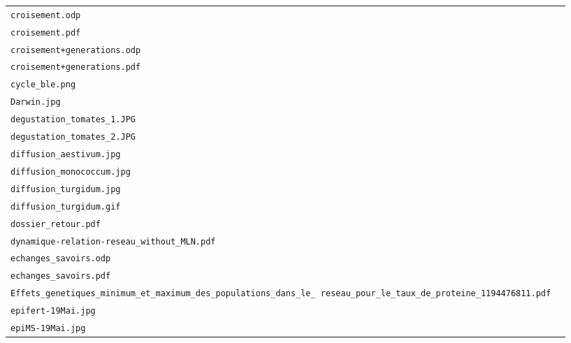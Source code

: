 \begin{center}
\begin{supertabular}{p{.8\textwidth}c}
\texttt{croisement.odp} & \cite{croisement} \\
\texttt{croisement.pdf} & \\ \hline

\texttt{croisement+generations.odp} & \cite{croisement+generations} \\
\texttt{croisement+generations.pdf} &  \\ \hline

\texttt{cycle\_ble.png} & \cite{cycle_ble} \\ \hline

\texttt{Darwin.jpg} & \cite{Darwin} \\ \hline

\texttt{degustation\_tomates\_1.JPG} & \cite{degustation_tomates_1} \\ \hline

\texttt{degustation\_tomates\_2.JPG} & \cite{degustation_tomates_2} \\ \hline

\texttt{diffusion\_aestivum.jpg} & \cite{diffusion_aestivum} \\ \hline

\texttt{diffusion\_monococcum.jpg} & \cite{diffusion_monococcum} \\ \hline

\texttt{diffusion\_turgidum.jpg} & \cite{diffusion_turgidum} \\
\texttt{diffusion\_turgidum.gif} & \\ \hline

\texttt{dossier\_retour.pdf} & \cite{dossier_retour} \\ \hline

\texttt{dynamique-relation-reseau\_without\_MLN.pdf} & \cite{dynamique-relation-reseau_without_MLN} \\ \hline

\texttt{echanges\_savoirs.odp} & \cite{echanges_savoirs} \\
\texttt{echanges\_savoirs.pdf} \\ \hline

\texttt{Effets\_genetiques\_minimum\_et\_maximum\_des\_populations\_dans\_le\_
reseau\_pour\_le\_taux\_de\_proteine\_1194476811.pdf} & \cite{Effets_genetiques_minimum_et_maximum_des_populations_dans_le_reseau_pour_le_taux_de_proteine_1194476811} \\ \hline

\texttt{epifert-19Mai.jpg} & \cite{epifert-19Mai} \\ \hline

\texttt{epiMS-19Mai.jpg} & \cite{epiMS-19Mai} \\ \hline


\end{supertabular}
\end{center}
